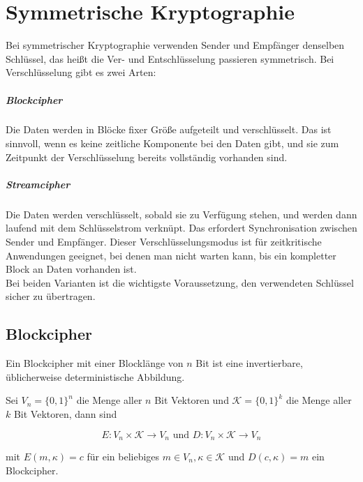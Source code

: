 \chapter{Symmetrische Kryptographie}

Bei symmetrischer Kryptographie verwenden Sender und Empfänger denselben Schlüssel, das heißt die Ver- und Entschlüsselung passieren symmetrisch.
Bei Verschlüsselung gibt es zwei Arten:

\paragraph{Blockcipher} Die Daten werden in Blöcke fixer Größe aufgeteilt und verschlüsselt. Das ist sinnvoll, wenn es keine zeitliche Komponente bei 
den Daten gibt, 
und sie zum Zeitpunkt der Verschlüsselung bereits vollständig vorhanden sind. 

\paragraph{Streamcipher} Die Daten werden verschlüsselt, sobald sie zu Verfügung stehen, und werden dann laufend mit dem 
Schlüsselstrom verknüpt. 
Das erfordert Synchronisation zwischen Sender und Empfänger. Dieser Verschlüsselungsmodus ist für zeitkritische Anwendungen geeignet, bei denen man nicht warten kann, bis 
ein kompletter Block an Daten vorhanden ist. \\

\noindent Bei beiden Varianten ist die wichtigste Voraussetzung, den verwendeten Schlüssel sicher zu übertragen.

\section{Blockcipher}

\begin{definition}[Blockcipher]
Ein Blockcipher mit einer Blocklänge von $n$ Bit ist eine invertierbare, üblicherweise deterministische Abbildung.

Sei $V_n = \{0, 1\}^n$ die Menge aller $n$ Bit Vektoren und $\mathcal{K} = \{0, 1\}^k$ die Menge aller $k$ Bit Vektoren, dann sind

$$E: V_n \times \mathcal{K} \to V_n \text{ und } D: V_n \times \mathcal{K} \to V_n$$

mit $E(m, \kappa) = c$ für ein beliebiges $m \in V_n, \kappa \in \mathcal{K}$ und $D(c, \kappa) = m$ ein Blockcipher.
\end{definition}

